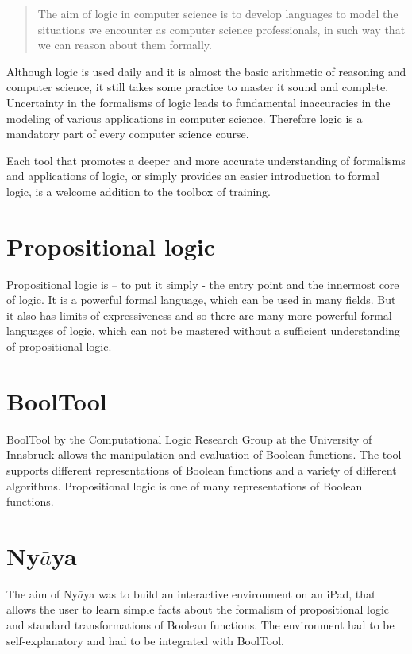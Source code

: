
\begin{quote}
The aim of logic in computer science is to develop languages 
to model the situations we encounter as computer science professionals, 
in such way that we can reason about them formally. \cite{Huth:2004:LCS:975331}
\end{quote}

Although logic is used daily and it is almost the basic arithmetic of reasoning and computer science, 
it still takes some practice to master it sound and complete. 
Uncertainty in the formalisms of logic leads to fundamental inaccuracies 
in the modeling of various applications in computer science. 
Therefore logic is a mandatory part of every computer science course. 

Each tool that promotes a deeper and more accurate understanding of formalisms and applications of logic,
or simply provides an easier introduction to formal logic, 
is a welcome addition to the toolbox of training.

\section{Propositional logic}

Propositional logic is – to put it simply - the entry point and the innermost core of logic. 
It is a powerful formal language, which can be used in many fields. 
But it also has limits of expressiveness and so 
there are many more powerful formal languages of logic, 
which can not be mastered without a sufficient understanding  of propositional logic.

\section{BoolTool}

BoolTool by the Computational Logic Research Group at the University of Innsbruck allows the manipulation and evaluation of Boolean functions. The tool supports different representations of Boolean functions and a variety of different algorithms.
Propositional logic is one of many representations of Boolean functions.

\section{Ny$\bar{a}$ya}

The aim of Ny$\bar{a}$ya was to build an interactive environment on an iPad,
that allows the user to learn simple facts about the formalism of propositional logic 
and standard transformations of Boolean functions. 
The environment had to be self-explanatory and had to be integrated with BoolTool. 


%
